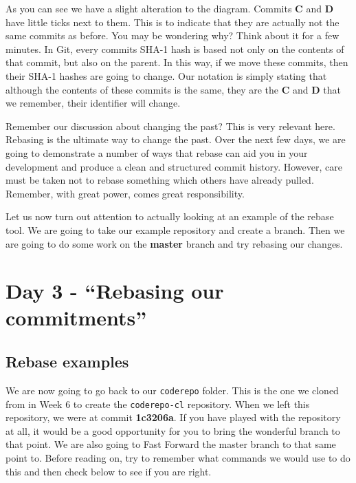 As you can see we have a slight alteration to the diagram.
Commits \textbf{C} and \textbf{D} have little ticks next to them.
This is to indicate that they are actually not the same commits as before.
You may be wondering why? Think about it for a few minutes.
In Git, every commits SHA-1 hash is based not only on the contents of that commit, but also on the parent.
In this way, if we move these commits, then their SHA-1 hashes are going to change.
Our notation is simply stating that although the contents of these commits is the same, they are the \textbf{C} and \textbf{D} that we remember, their identifier will change.

Remember our discussion about changing the past? This is very relevant here.
Rebasing is the ultimate way to change the past.
Over the next few days, we are going to demonstrate a number of ways that rebase can aid you in your development and produce a clean and structured commit history.
However, care must be taken not to rebase something which others have already pulled.
Remember, with great power, comes great responsibility.

Let us now turn out attention to actually looking at an example of the rebase tool.
We are going to take our example repository and create a branch.
Then we are going to do some work on the \textbf{master} branch and try rebasing our changes.

\section{Day 3 - ``Rebasing our commitments''}
\subsection{Rebase examples}

We are now going to go back to our \texttt{coderepo} folder.
This is the one we cloned from in Week 6 to create the \texttt{coderepo-cl} repository.
When we left this repository, we were at commit \textbf{1c3206a}.
If you have played with the repository at all, it would be a good opportunity for you to bring the wonderful branch to that point.
We are also going to Fast Forward the master branch to that same point to.
Before reading on, try to remember what commands we would use to do this and then check below to see if you are right.


